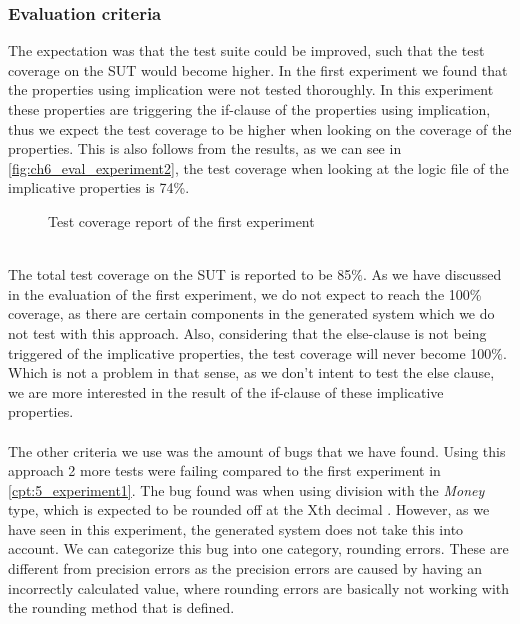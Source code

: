 \subsubsection{Evaluation criteria}
The expectation was that the test suite could be improved, such that the test coverage on the SUT would become higher. In the first experiment we found that the properties using implication were not tested thoroughly. In this experiment these properties are triggering the if-clause of the properties using implication, thus we expect the test coverage to be higher when looking on the coverage of the properties. This is also follows from the results, as we can see in \autoref{fig:ch6_eval_experiment2}, the test coverage when looking at the logic file of the implicative properties is 74\%.
\\
\begin{figure}[h!]
\caption{Test coverage report of the first experiment}
\label{fig:ch6_eval_experiment2}
\centering
\end{figure}
\\
The total test coverage on the SUT is reported to be 85\%. As we have discussed in the evaluation of the first experiment, we do not expect to reach the 100\% coverage, as there are certain components in the generated system which we do not test with this approach. Also, considering that the else-clause is not being triggered of the implicative properties, the test coverage will never become 100\%. Which is not a problem in that sense, as we don't intent to test the else clause, we are more interested in the result of the if-clause of these implicative properties.\\
\\
The other criteria we use was the amount of bugs that we have found. Using this approach 2 more tests were failing compared to the first experiment in \autoref{cpt:5_experiment1}. The bug found was when using division with the \textit{Money} type, which is expected to be rounded off at the Xth decimal . However, as we have seen in this experiment, the generated system does not take this into account. We can categorize this bug into one category, rounding errors. These are different from precision errors as the precision errors are caused by having an incorrectly calculated value, where rounding errors are basically not working with the rounding method that is defined.





























